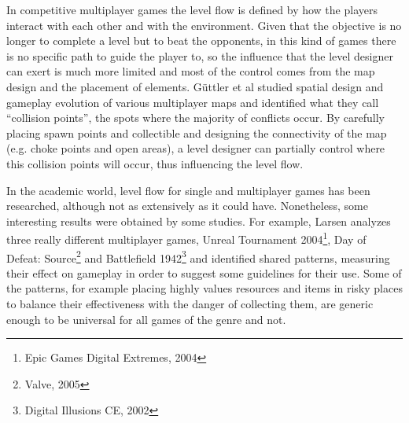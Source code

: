 
In competitive multiplayer games the level flow is defined by how the players interact with each other and with the environment. Given that the objective is no longer to complete a level but to beat the opponents, in this kind of games there is no specific path to guide the player to, so the influence that the level designer can exert is much more limited and most of the control comes from the map design and the placement of elements. Güttler et al \cite{spatial_principles_level_design} studied spatial design and gameplay evolution of various multiplayer maps and identified what they call “collision points”, the spots where the majority of conflicts occur. By carefully placing spawn points and collectible and designing the connectivity of the map (e.g. choke points and open areas), a level designer can partially control where this collision points will occur, thus influencing the level flow. 

In the academic world, level flow for single and multiplayer games has been researched, although not as extensively as it could have. Nonetheless, some interesting results were obtained by some studies. 
For example, Larsen \cite{larsenleveldesignpatterns} analyzes three really different multiplayer games, Unreal Tournament 2004\footnote{Epic Games
Digital Extremes, 2004}, Day of Defeat: Source\footnote{Valve, 2005} and Battlefield 1942\footnote{Digital Illusions CE, 2002} and identified shared patterns, measuring their effect on gameplay in order to suggest some guidelines for their use. Some of the patterns, for example placing highly values resources and items in risky places  to balance their effectiveness with the danger of collecting them, are generic enough to be universal for all games of the genre and not. 

